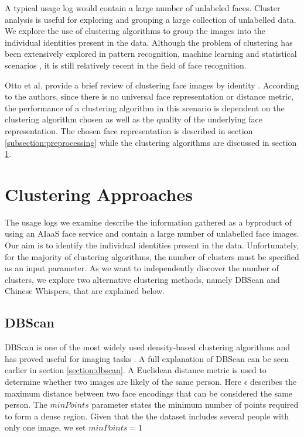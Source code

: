 \documentclass[a4paper,12pt]{report}
\begin{document}
	A typical usage log would contain a large number of unlabeled faces. Cluster analysis is useful for exploring and grouping a large collection of unlabelled data. We explore the use of clustering algorithms to group the images into the individual identities present in the data. Although the problem of clustering has been extensively explored in pattern recognition, machine learning and statistical scenarios \cite{jain2010data}, it is still relatively recent in the field of face recognition. 
	
	Otto et al. provide a brief review of clustering face images by identity \cite{otto2017clustering}. According to the authors, since there is no universal face representation or distance metric, the performance of a clustering algorithm in this scenario is dependent on the clustering algorithm chosen as well as the quality of the underlying face representation. The chosen face representation is described in section \ref{subsection:preprocessing} while the clustering algorithms are discussed in section \ref{section:clustering_approaches}.
	
	\section{Clustering Approaches}
	\label{section:clustering_approaches}
	The usage logs we examine describe the information gathered as a byproduct of using an AIaaS face service and contain a large number of unlabelled face images. Our aim is to identify the individual identities present in the data. Unfortunately, for the majority of clustering algorithms, the number of clusters must be specified as an input parameter. As we want to independently discover the number of clusters, we explore two alternative clustering methods, namely DBScan and Chinese Whispers, that are explained below. 
	
	\subsection{DBScan}
	DBScan is one of the most widely used density-based clustering algorithms and has proved useful for imaging tasks \cite{dhanachandra2017survey}. A full explanation of DBScan can be seen earlier in section \ref{section:dbscan}. A Euclidean distance metric is used to determine whether two images are likely of the same person. Here $\epsilon$ describes the maximum distance between two face encodings that can be considered the same person. The $minPoints$ parameter states the minimum number of points required to form a dense region. Given that the the dataset includes several people with only one image, we set $minPoints=1$ 
	
\end{document}
